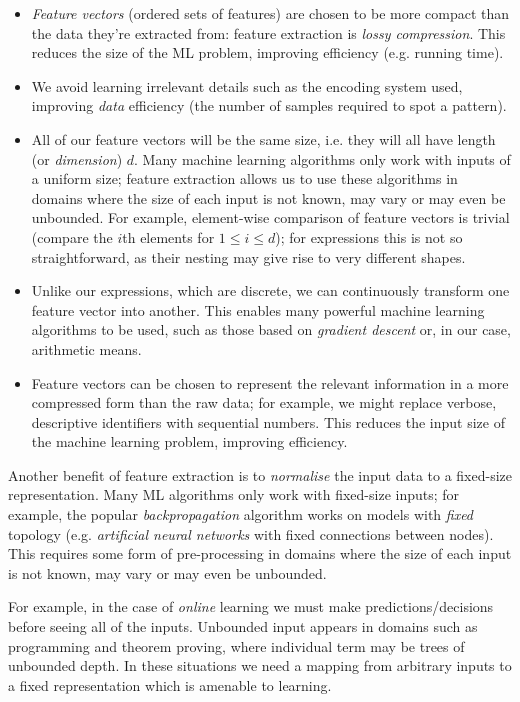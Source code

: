 \begin{itemize}
\item \emph{Feature vectors} (ordered sets of features) are chosen to be more
  compact than the data they're extracted from: feature extraction is
  \emph{lossy compression}. This reduces the size of the ML problem, improving
  efficiency (e.g. running time).
\item We avoid learning irrelevant details such as the encoding system used,
  improving \emph{data} efficiency (the number of samples required to spot a
  pattern).
\item All of our feature vectors will be the same size, i.e. they will all have
  length (or \emph{dimension}) $d$. Many machine learning algorithms only work
  with inputs of a uniform size; feature extraction allows us to use these
  algorithms in domains where the size of each input is not known, may vary or
  may even be unbounded. For example, element-wise comparison of feature vectors
  is trivial (compare the $i$th elements for $1 \leq i \leq d$); for expressions
  this is not so straightforward, as their nesting may give rise to very
  different shapes.
\item Unlike our expressions, which are discrete, we can continuously transform
  one feature vector into another. This enables many powerful machine learning
  algorithms to be used, such as those based on \emph{gradient descent} or, in
  our case, arithmetic means.
\item Feature vectors can be chosen to represent the relevant information in a
  more compressed form than the raw data; for example, we might replace verbose,
  descriptive identifiers with sequential numbers. This reduces the input size
  of the machine learning problem, improving efficiency.
\end{itemize}

Another benefit of feature extraction is to \emph{normalise} the input data to a
fixed-size representation. Many ML algorithms only work with fixed-size inputs;
for example, the popular \emph{backpropagation} \cite{Russell:2003:AIM:773294}
algorithm works on models with \emph{fixed} topology (e.g. \emph{artificial
  neural networks} with fixed connections between nodes). This requires some
form of pre-processing in domains where the size of each input is not known, may
vary or may even be unbounded.

For example, in the case of \emph{online} learning we must make
predictions/decisions before seeing all of the inputs. Unbounded input appears
in domains such as programming and theorem proving, where individual term may be
trees of unbounded depth. In these situations we need a mapping from arbitrary
inputs to a fixed representation which is amenable to learning.

